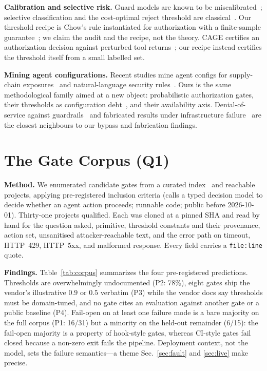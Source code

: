 \documentclass[conference]{IEEEtran}
\newcommand{\code}[1]{\texttt{\small #1}}
\begin{document}
\textbf{Calibration and selective risk.} Guard models are known to be
miscalibrated~\cite{guardcal2025}; selective classification and the cost-optimal reject
threshold are classical~\cite{chow1970,elyaniv2010,guo2017}. Our threshold recipe is
Chow's rule instantiated for authorization with a finite-sample
guarantee~\cite{clopper1934}; we claim the audit and the recipe, not the theory. CAGE
certifies an authorization decision against perturbed tool returns~\cite{cage2026}; our recipe
instead certifies the threshold itself from a small labelled set.

\textbf{Mining agent configurations.} Recent studies mine agent configs for supply-chain
exposures~\cite{scanharness2026} and natural-language security rules~\cite{donotdeny2026}.
Ours is the same methodological family aimed at a new object: probabilistic authorization
gates, their thresholds as configuration debt~\cite{sculley2015}, and their availability
axis. Denial-of-service against guardrails~\cite{dosguard2026} and fabricated results under
infrastructure failure~\cite{scapegoats2026} are the closest neighbours to our bypass and
fabrication findings.

\section{The Gate Corpus (Q1)}
\label{sec:corpus}
\textbf{Method.} We enumerated candidate gates from a curated
index~\cite{awesomejev} and reachable projects, applying pre-registered inclusion criteria
(calls a typed decision model to decide whether an agent action proceeds; runnable code;
public before 2026-10-01). Thirty-one projects qualified. Each was cloned at a pinned SHA
and read by hand for the question asked, primitive, threshold constants and their
provenance, action set, unsanitised attacker-reachable text, and the error path on timeout,
HTTP~429, HTTP~5xx, and malformed response. Every field carries a \code{file:line} quote.

\textbf{Findings.} Table~\ref{tab:corpus} summarizes the four pre-registered predictions.
Thresholds are overwhelmingly undocumented (P2: 78\%), eight gates ship the vendor's
illustrative $0.9$ or $0.5$ verbatim (P3) while the vendor docs say thresholds must be
domain-tuned, and no gate cites an evaluation against another gate or a public baseline
(P4). Fail-open on at least one failure mode is a bare majority on the full corpus (P1:
16/31) but a minority on the held-out remainder (6/15): the fail-open majority is a property
of hook-style gates, whereas CI-style gates fail closed because a non-zero exit fails the
pipeline. Deployment context, not the model, sets the failure semantics---a theme
Sec.~\ref{sec:fault} and \ref{sec:live} make precise.
\end{document}
